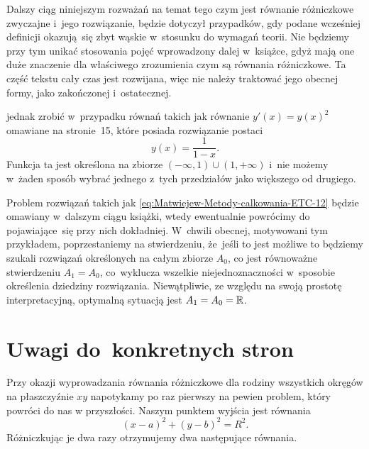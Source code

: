 \documentclass[a4paper,11pt]{article}
\numberwithin{equation}{section}
\begin{document}
Dalszy ciąg niniejszym rozważań na temat tego czym jest równanie
różniczkowe zwyczajne i~jego rozwiązanie, będzie dotyczył przypadków, gdy
podane wcześniej definicji okazują~się zbyt wąskie w~stosunku do wymagań
teorii. Nie będziemy przy tym unikać stosowania pojęć wprowadzony dalej
w~książce, gdyż mają one duże znaczenie dla właściwego zrozumienia czym są
równania różniczkowe. Ta część tekstu cały czas jest rozwijana, więc nie
należy traktować jego obecnej formy, jako zakończonej i~ostatecznej.


jednak zrobić w~przypadku
równań takich jak równanie $y'( x ) = y( x )^{ 2 }$ omawiane na stronie~15,
które posiada rozwiązanie postaci
\begin{equation}
  \label{eq:Matwiejew-Metody-calkowania-ETC-12-111}
  y( x ) = \frac{ 1 }{ 1 - x }.
\end{equation}
Funkcja ta jest określona na zbiorze $( -\infty, 1 ) \cup ( 1, +\infty )$ i~nie możemy
w~żaden sposób wybrać jednego z~tych przedziałów jako większego od drugiego.

Problem rozwiązań takich jak \eqref{eq:Matwiejew-Metody-calkowania-ETC-12}
będzie omawiany w~dalszym ciągu książki, wtedy ewentualnie powrócimy do
pojawiające~się przy nich dokładniej. W~chwili obecnej, motywowani tym
przykładem, poprzestaniemy na stwierdzeniu, że~jeśli to jest możliwe to
będziemy szukali rozwiązań określonych na całym zbiorze $A_{ 0 }$, co jest
równoważne stwierdzeniu $A_{ 1 } = A_{ 0 }$, co~wyklucza wszelkie
niejednoznaczności w~sposobie określenia dziedziny rozwiązania.
Niewątpliwie, ze względu na swoją prostotę interpretacyjną, optymalną
sytuacją jest $A_{ 1 } = A_{ 0 } = \mathbb{R}$.








\section{Uwagi do~konkretnych stron}

\label{sec:Uwagi-do-konkrentych-stron}



\VerSpaceFour





\noindent
{} Przy okazji wyprowadzania równania różniczkowe dla rodziny
wszystkich okręgów na płaszczyźnie $xy$ napotykamy po raz pierwszy na
pewien problem, który powróci do nas w przyszłości. Naszym punktem wyjścia
jest równania
\begin{equation}
  \label{eq:Matwiejew-Metody-calkowania-ETC-22}
  ( x - a )^{ 2 } + ( y - b )^{ 2 } = R^{ 2 }.
\end{equation}
Różniczkując je dwa razy otrzymujemy dwa następujące równania.
\end{document}
